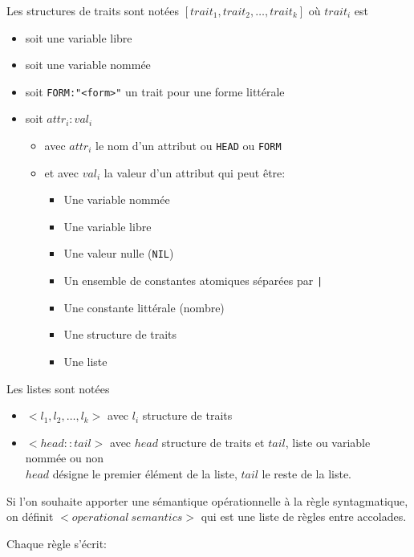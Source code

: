 \documentclass[11pt]{article}
\begin{document}
Les structures de traits sont notées $[ trait_1, trait_2, \dots , trait_k ]$ où $trait_i$ est
\begin{itemize}
\item soit une variable libre
\item soit une variable nommée
\item soit \verb#FORM:"<form>"# un trait pour une forme littérale
\item soit $attr_i:val_i$
  \begin{itemize}
  \item avec $attr_i$ le nom d'un attribut ou \texttt{HEAD} ou \texttt{FORM}
  \item et avec $val_i$ la valeur d'un attribut qui peut être: 
    
    \begin{itemize}
    \item Une variable nommée
    \item Une variable libre
    \item Une valeur nulle (\texttt{NIL})
    \item Un ensemble de constantes atomiques séparées par \verb#|#
    \item Une constante littérale (nombre)
    \item Une structure de traits
    \item Une liste
    \end{itemize}
  \end{itemize}
  
\end{itemize}

Les listes sont notées
\begin{itemize}
\item $<l_1, l_2, \dots, l_k>$ avec $l_i$ structure de traits
\item $<head::tail>$ avec $head$ structure de traits et $tail$, liste ou variable nommée ou non\\
  $head$ désigne le premier élément de la liste, $tail$ le reste de la liste.\\
\end{itemize}

 Si l'on souhaite apporter une sémantique opérationnelle à la règle syntagmatique, on
définit $<operational~semantics>$ qui est une liste de règles entre accolades.

Chaque règle s'écrit:
\end{document}
